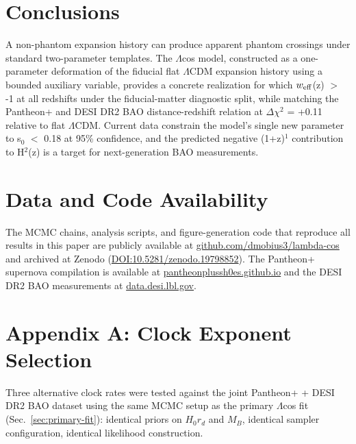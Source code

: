 \section{Conclusions}\label{sec:conclusions}

A non-phantom expansion history can produce apparent phantom crossings
under standard two-parameter templates. The $\Lambda$cos model, constructed as a
one-parameter deformation of the fiducial flat $\Lambda$CDM expansion history
using a bounded auxiliary variable, provides a concrete realization for
which $w_{\rm eff}$(z) $>$ -1 at all redshifts under the
fiducial-matter diagnostic split, while matching the Pantheon+ and DESI
DR2 BAO distance-redshift relation at $\Delta\chi^2$ = +0.11 relative to flat $\Lambda$CDM.
Current data constrain the model's single new parameter to s$_0$
$<$ 0.18 at 95\% confidence, and the predicted negative (1+z)$^1$
contribution to H$^2$(z) is a target for next-generation BAO measurements.

\section{Data and Code Availability}\label{sec:data-availability}

The MCMC chains, analysis scripts, and figure-generation code that
reproduce all results in this paper are publicly available at
\href{https://github.com/dmobius3/lambda-cos}{github.com/dmobius3/lambda-cos}
and archived at Zenodo
(\href{https://doi.org/10.5281/zenodo.19798852}{DOI:10.5281/zenodo.19798852}).
The Pantheon+ supernova compilation \cite{ref2} is available at
\href{https://pantheonplussh0es.github.io/}{pantheonplussh0es.github.io}
and the DESI DR2 BAO measurements \cite{ref1} at
\href{https://data.desi.lbl.gov/}{data.desi.lbl.gov}.

\section{Appendix A: Clock Exponent Selection}\label{sec:appendix}

Three alternative clock rates were tested against the joint Pantheon+ +
DESI DR2 BAO dataset using the same MCMC setup as the primary $\Lambda$cos fit
(Sec.~\ref{sec:primary-fit}): identical priors on $H_0 r_d$ and $M_B$, identical sampler
configuration, identical likelihood construction.

